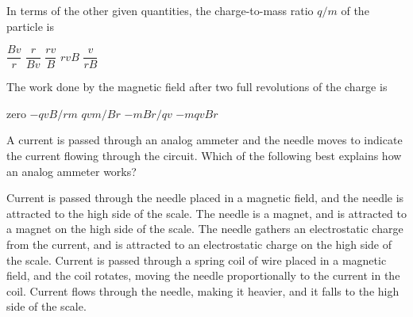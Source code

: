\documentclass{../../../oss-classkick-exam}
\begin{document}
\begin{multicols*}{2}
\begin{questions}
    \question In terms of the other given quantities, the charge-to-mass ratio
    $q/m$ of the particle is
    \begin{choices}
      \choice $\dfrac{Bv}{r}$
      \choice $\dfrac{r}{Bv}$
      \choice $\dfrac{rv}{B}$
      \choice $rvB$
      \choice $\dfrac{v}{rB}$
    \end{choices}
    \label{q:circ1}
    
    \question The work done by the magnetic field after two full revolutions of
    the charge is
    \begin{choices}
      \choice zero
      \choice $-qvB/rm$
      \choice $qvm/Br$
      \choice $-mBr/qv$
      \choice $-mqvBr$
    \end{choices}
    \label{q:circ2}
    \columnbreak
    

    \question A current is passed through an analog ammeter and the needle moves
    to indicate the current flowing through the circuit. Which of the
    following best explains how an analog ammeter works?
    \begin{choices}
      \choice Current is passed through the needle placed in a magnetic field,
      and the needle is attracted to the high side of the scale.
      \choice The needle is a magnet, and is attracted to a magnet on the high
      side of the scale.
      \choice The needle gathers an electrostatic charge from the current, and
      is attracted to an electrostatic charge on the high side of the scale.
      \choice Current is passed through a spring coil of wire placed in a
      magnetic field, and the coil rotates, moving the needle
      proportionally to the current in the coil.
      \choice Current flows through the needle, making it heavier, and it falls
      to the high side of the scale.
    \end{choices}
    \vspace{.7in}
    

\end{questions}
\end{multicols*}
\end{document}
